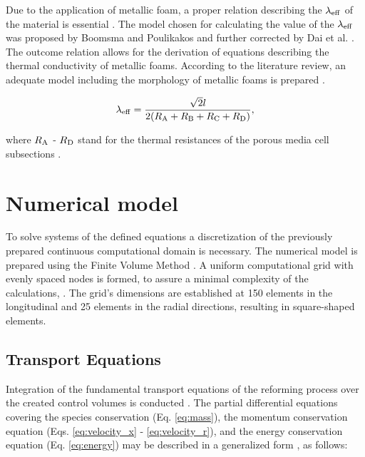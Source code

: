 \documentclass[preprint,12pt]{elsarticle}
\begin{document}
\vspace{3mm}

Due to the application of metallic foam, a proper relation describing the $\lambda_{\rm{eff}}$ of the material is essential \cite{Bhattacharya2002}.  The model chosen for calculating the value of the $\lambda_{\rm{eff}}$ was proposed by Boomsma and Poulikakos and further corrected by Dai et al. \cite{Boomsma2001, Dai2010}. The outcome relation allows for the derivation of equations describing the thermal conductivity of metallic foams. According to the literature review, an adequate model including the morphology of metallic foams is prepared \cite{Pajak2021IJHEa}.
 
\begin{equation}
\label{eq:eff_cond} 
\lambda_{\rm{eff}}=\frac{\sqrt{2}l}{2(R_{\rm{A}}+R_{\rm{B}}+R_{\rm{C}}+R_{\rm{D}})},
\end{equation}

\vspace{3mm}
\noindent where $R_{\rm{A}}$ - $R_{\rm{D}}$ stand for the thermal resistances of the porous media cell subsections \cite{Pajak2018, Dai2010}.


\section{Numerical model}
\label{sec:num_model}

To solve systems of the defined equations a discretization of the previously prepared continuous computational domain is necessary. The numerical model is prepared using the Finite Volume Method \cite{Moukalled2016}.  A uniform computational grid with evenly spaced nodes is formed, to assure a minimal complexity of the calculations, \cite{Kaw2011}. The grid's dimensions are established at 150 elements in the longitudinal and 25 elements in the radial directions, resulting in square-shaped elements. 



\subsection{Transport Equations}
\label{sec:trans_eqs}

Integration of the fundamental transport equations of the reforming process over the created control volumes is conducted \cite{Patankar1980}.  The partial differential equations covering the species conservation (Eq. \eqref{eq:mass}),  the momentum conservation equation (Eqs. \eqref{eq:velocity_x} - \eqref{eq:velocity_r}), and the energy conservation equation (Eq. \eqref{eq:energy}) may be described in a generalized form \cite{Patankar1980}, as follows: 
\end{document}
